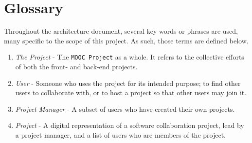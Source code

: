 \documentclass[a4paper, 12pt]{article}
\newcommand{\projectTitle}{\texttt{MOOC Project} }
\begin{document}
\section{Glossary}
	Throughout the architecture document, several key words or phrases are used, many specific to the scope of this project. As such, those terms are defined below.

	\begin{enumerate}
		\item \emph{The Project} - The \projectTitle as a whole. It refers to the collective efforts of both the front- and back-end projects.

		\item \emph{User} - Someone who uses the project for its intended purpose; to find other users to collaborate with, or to host a project so that other users may join it.

		\item \emph{Project Manager} - A subset of users who have created their own projects.

		\item \emph{Project} - A digital representation of a software collaboration project, lead by a project manager, and a list of users who are members of the project.

	\end{enumerate}
\end{document}
